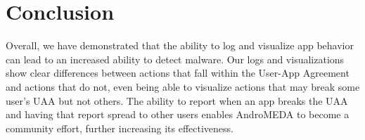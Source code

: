 \section{Conclusion}
Overall, we have demonstrated that the ability to log and visualize app behavior can lead to an increased ability to detect malware. Our logs and visualizations show clear differences between actions that fall within the User-App Agreement and actions that do not, even being able to visualize actions that may break some user's UAA but not others. The ability to report when an app breaks the UAA and having that report spread to other users enables AndroMEDA to become a community effort, further increasing its effectiveness.





